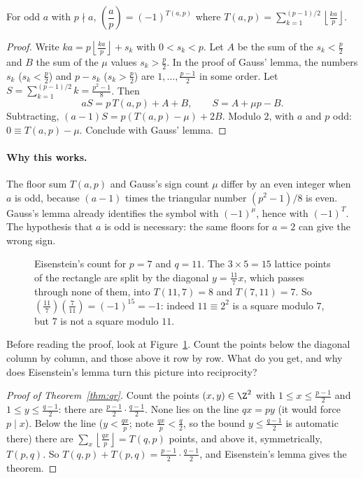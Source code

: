 \begin{lemma}[Eisenstein]\label{lem:eisenstein}
For odd $a$ with $p\nmid a$, $\left(\dfrac ap\right)=(-1)^{T(a,p)}$ where $T(a,p)=\displaystyle\sum_{k=1}^{(p-1)/2}\left\lfloor\frac{ka}p\right\rfloor$.
\end{lemma}
\begin{proof}
Write $ka=p\left\lfloor\frac{ka}p\right\rfloor+s_k$ with $0<s_k<p$. Let $A$ be the sum of the $s_k<\frac p2$ and $B$ the sum of the $\mu$ values $s_k>\frac p2$. In the proof of Gauss' lemma, the numbers $s_k$ ($s_k<\frac p2$) and $p-s_k$ ($s_k>\frac p2$) are $1,\dots,\frac{p-1}2$ in some order. Let $S=\sum_{k=1}^{(p-1)/2}k=\frac{p^2-1}8$. Then
\[
aS=p\,T(a,p)+A+B,\qquad S=A+\mu p-B.
\]
Subtracting, $(a-1)S=p\left(T(a,p)-\mu\right)+2B$. Modulo $2$, with $a$ and $p$ odd: $0\equiv T(a,p)-\mu$. Conclude with Gauss' lemma.
\end{proof}

\paragraph{Why this works.}
The floor sum $T(a,p)$ and Gauss's sign count $\mu$ differ by an even integer when $a$ is odd, because $(a-1)$ times the triangular number $(p^2-1)/8$ is even. Gauss's lemma already identifies the symbol with $(-1)^\mu$, hence with $(-1)^T$. The hypothesis that $a$ is odd is necessary: the same floors for $a=2$ can give the wrong sign.

\begin{figure}[ht]
\centering
{}
\caption{Eisenstein's count for $p=7$ and $q=11$. The $3\times5=15$ lattice points of the rectangle are split by the diagonal $y=\frac{11}7x$, which passes through none of them, into $T(11,7)=8$ and $T(7,11)=7$. So $\left(\frac{11}7\right)\left(\frac7{11}\right)=(-1)^{15}=-1$: indeed $11\equiv2^2$ is a square modulo $7$, but $7$ is not a square modulo $11$.}
\label{fig:eisenstein}
\end{figure}

\begin{think}
Before reading the proof, look at Figure~\ref{fig:eisenstein}. Count the points below the diagonal column by column, and those above it row by row. What do you get, and why does Eisenstein's lemma turn this picture into reciprocity?
\end{think}

\begin{proof}[Proof of Theorem~\ref{thm:qr}]
Count the points $(x,y)\in\Z^2$ with $1\le x\le\frac{p-1}2$ and $1\le y\le\frac{q-1}2$: there are $\frac{p-1}2\cdot\frac{q-1}2$. None lies on the line $qx=py$ (it would force $p\mid x$). Below the line ($y<\frac{qx}p$; note $\frac{qx}p<\frac q2$, so the bound $y\le\frac{q-1}2$ is automatic there) there are $\sum_x\left\lfloor\frac{qx}p\right\rfloor=T(q,p)$ points, and above it, symmetrically, $T(p,q)$. So $T(q,p)+T(p,q)=\frac{p-1}2\cdot\frac{q-1}2$, and Eisenstein's lemma gives the theorem.
\end{proof}


